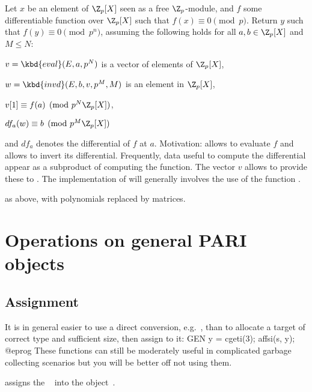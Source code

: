 Let $x$ be an element of $\Z_p[X]$ seen as a free  $\Z_p$-module, and $f$
some differentiable function over $\Z_p[X]$ such that $f(x) \equiv 0
\pmod{p}$. Return $y$ such that $f(y) \equiv 0\pmod{p^n}$, assuming the
following holds for all $a, b\in \Z_p[X]$ and $M\leq N$:

\item $v = \kbd{eval}(E,a,p^N)$ is a vector of elements of $\Z_p[X]$,

\item $w = \kbd{invd}(E,b,v,p^M,M)$ is an element in $\Z_p[X]$,

\item $v[1] \equiv f(a) \pmod{p^N\Z_p[X]}$,

\item $df_a(w) \equiv b \pmod{p^M\Z_p[X]}$

\noindent and $df_a$ denotes the differential of $f$ at $a$. Motivation:
 allows to evaluate $f$ and  allows to invert its
differential. Frequently, data useful to compute the differential appear as a
subproduct of computing the function. The vector $v$ allows  to
provide these to . The implementation of  will generally
involves the use of the function .

as above, with polynomials replaced by matrices.

\newpage
\chapter{Operations on general PARI objects}

\section{Assignment}

It is in general easier to use a direct conversion,
e.g.~, than to allocate a target of correct type and
sufficient size, then assign to it:
\bprog
  GEN y = cgeti(3); affsi(s, y);
@eprog\noindent
These functions can still be moderately useful in complicated garbage
collecting scenarios but you will be better off not using them.

 assigns the ~ into the
object~.

